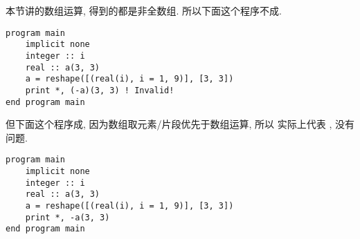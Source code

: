 本节讲的数组运算, 得到的都是非全数组. 所以下面这个程序不成.
\begin{lstlisting}
program main
    implicit none
    integer :: i
    real :: a(3, 3)
    a = reshape([(real(i), i = 1, 9)], [3, 3])
    print *, (-a)(3, 3) ! Invalid!
end program main
\end{lstlisting}
但下面这个程序成, 因为数组取元素/片段优先于数组运算, 所以  实际上代表 , 没有问题.
\begin{lstlisting}
program main
    implicit none
    integer :: i
    real :: a(3, 3)
    a = reshape([(real(i), i = 1, 9)], [3, 3])
    print *, -a(3, 3)
end program main
\end{lstlisting}
